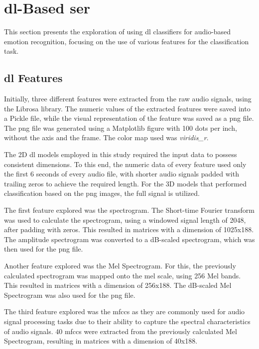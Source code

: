 \section{\acl{dl}-Based \ac{ser}}

This section presents the exploration of using \ac{dl} classifiers for audio-based emotion recognition, focusing on the use of various features for the classification task.

\subsection{\acl{dl} Features}

Initially, three different features were extracted from the raw audio signals, using the Librosa library. The numeric values of the extracted features were saved into a Pickle file, while the visual representation of the feature was saved as a \ac{png} file. The \ac{png} file was generated using a Matplotlib figure with 100 dots per inch, without the axis and the frame. The color map used was \textit{viridis\_r}.

The 2D \ac{dl} models employed in this study required the input data to possess consistent dimensions. To this end, the numeric data of every feature used only the first 6 seconds of every audio file, with shorter audio signals padded with trailing zeros to achieve the required length. For the 3D models that performed classification based on the \ac{png} images, the full signal is utilized.

The first feature explored was the spectrogram. The Short-time Fourier transform was used to calculate the spectrogram, using a windowed signal length of 2048, after padding with zeros. This resulted in matrices with a dimension of 1025x188. The amplitude spectrogram was converted to a dB-scaled spectrogram, which was then used for the \ac{png} file.

Another feature explored was the Mel Spectrogram. For this, the previously calculated spectrogram was mapped onto the mel scale, using 256 Mel bands. This resulted in matrices with a dimension of 256x188. The dB-scaled Mel Spectrogram was also used for the \ac{png} file.

The third feature explored was the \ac{mfccs} as they are commonly used for audio signal processing tasks due to their ability to capture the spectral characteristics of audio signals. 40 \ac{mfccs} were extracted from the previously calculated Mel Spectrogram, resulting in matrices with a dimension of 40x188.

